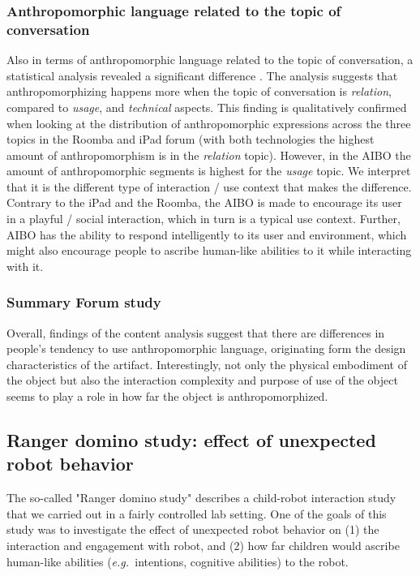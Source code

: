 \documentclass{frontiersSCNS} %
\newcommand{\eg}{{\textit{e.g.~}}}
\begin{document}
\subsubsection{Anthropomorphic language related to the topic of conversation\\}

Also in terms of anthropomorphic language related to the topic of conversation,
a statistical analysis revealed a significant difference
\citep{fink_anthropomorphic_2012}. The analysis suggests that anthropomorphizing
happens more when the topic of conversation is \textit{relation}, compared to
\textit{usage}, and \textit{technical} aspects. This finding is qualitatively
confirmed when looking at the distribution of anthropomorphic expressions across
the three topics in the Roomba and iPad forum (with both technologies the
highest amount of anthropomorphism is in the \textit{relation} topic). However,
in the AIBO the amount of anthropomorphic segments is highest for the
\textit{usage} topic.  We interpret that it is the different type of interaction
/ use context that makes the difference. Contrary to the iPad and the Roomba,
the AIBO is made to encourage its user in a playful / social interaction, which
in turn is a typical use context. Further, AIBO has the ability to respond
intelligently to its user and environment, which might also encourage people to
ascribe human-like abilities to it while interacting with it.


\subsubsection{Summary Forum study\\}

Overall, findings of the content analysis suggest that there are differences in
people's tendency to use anthropomorphic language, originating form the design
characteristics of the artifact. Interestingly, not only the physical embodiment
of the object but also the interaction complexity and purpose of use of the
object seems to play a role in how far the object is anthropomorphized.


\subsection{Ranger domino study: effect of unexpected robot behavior}

The so-called "Ranger domino study" describes a child-robot interaction study
that we carried out in a fairly controlled lab setting. One of the goals of this
study was to investigate the effect of unexpected robot behavior on (1) the
interaction and engagement with robot, and (2) how far children would ascribe
human-like abilities (\eg intentions, cognitive abilities) to the robot.
\end{document}
